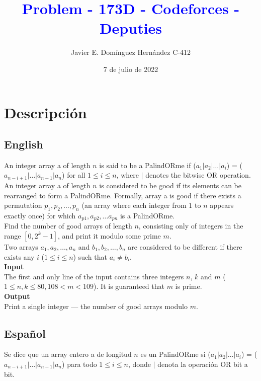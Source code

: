 \documentclass[12pt, a4paper]{article}
\begin{document}
    \title{\textcolor{blue}{\huge\textbf{Problem - 173D - Codeforces - Deputies}}\\}
	\author{\large{Javier E. Domínguez Hernández C-412}}  
    \date{7 de julio de 2022}
    \maketitle

	\section{Descripción}

	\subsection{English}

	An integer array a of length $n$ is said to be a PalindORme if ($a_1 | a_2 | … | a_i$) = ($a_{n−i+1} | … | a_{n−1} | a_n$) for all $1 \le i \le n$, where $|$ denotes the bitwise OR operation.\\

		An integer array a of length $n$ is considered to be good if its elements can be rearranged to form a PalindORme. Formally, array a is good if there exists a permutation $p_1, p_2,…, p_n$ (an array where each integer from $1$ to $n$ appears exactly once) for which $a_{p1}, a_{p2},…a_{pn}$ is a PalindORme.\\

		Find the number of good arrays of length $n$, consisting only of integers in the range $[0, 2^{k} - 1]$, and print it modulo some prime $m$.\\

		Two arrays $a_1, a_2, …, a_n$ and $b_1, b_2, …, b_n$ are considered to be different if there exists any $i$ ($1 \le i \le n$) such that $a_i \neq b_i$.\\

		{\bf Input}\\
		The first and only line of the input contains three integers $n$, $k$ and $m$ ($1 \le n,k \le 80, 108 <m < 109$). It is guaranteed that $m$ is prime.\\

		{\bf Output}\\
		Print a single integer  — the number of good arrays modulo $m$.\\
		\newpage

	\subsection{Español}
	Se dice que un array entero a de longitud $n$ es un PalindORme si ($a_1 | a_2 | … | a_i$) = ($a_{n−i+1} | … | a_{n−1} | a_n$) para todo $1 \le i \le n$, donde $|$ denota la operación OR bit a bit.\\
\end{document}
